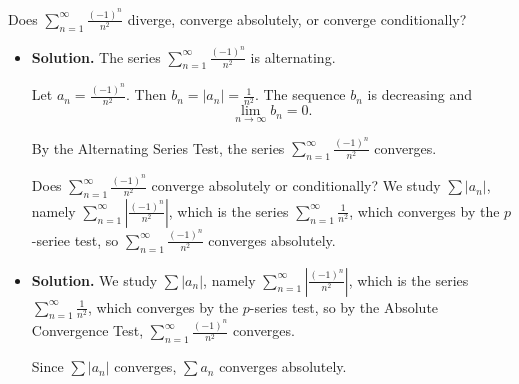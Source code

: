 \documentclass{article}
\begin{document}
\noindent
Does $\displaystyle \sum_{n=1}^\infty \frac{(-1)^n}{n^2}$
diverge, converge absolutely, or converge conditionally?

\begin{itemize}

\item {\bf Solution.} The series $\displaystyle \sum_{n=1}^\infty \frac{(-1)^n}{n^2}$ is alternating.

Let $a_n = \frac{(-1)^n}{n^2}$. Then $b_n = |a_n| = \frac1{n^2}$. The sequence $b_n$ is decreasing and 
\[ \lim_{n \rightarrow \infty} b_n = 0.\]

By the Alternating Series Test, the series
$\displaystyle \sum_{n=1}^\infty \frac{(-1)^n}{n^2}$
converges.

Does $\displaystyle \sum_{n=1}^\infty \frac{(-1)^n}{n^2}$ converge absolutely or conditionally?
We study $\sum |a_n|$, namely $\displaystyle \sum_{n=1}^\infty \left|\frac{(-1)^n}{n^2}\right|$, which is the series 
$\displaystyle \sum_{n=1}^\infty \frac{1}{n^2}$, which converges by the $p$-seriee test, so 
$\displaystyle \sum_{n=1}^\infty \frac{(-1)^n}{n^2}$ converges absolutely.

\item {\bf Solution.}
We study $\sum |a_n|$, namely $\displaystyle \sum_{n=1}^\infty \left|\frac{(-1)^n}{n^2}\right|$, which is the series 
$\displaystyle \sum_{n=1}^\infty \frac{1}{n^2}$, which converges by the $p$-series test, so by the Absolute Convergence Test,
$\displaystyle \sum_{n=1}^\infty \frac{(-1)^n}{n^2}$
converges.

Since $\sum |a_n|$ converges, $\sum a_n$ converges absolutely.

\end{itemize}
\end{document}
